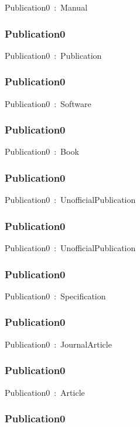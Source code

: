 \documentclass{article}
\begin{document}
Publication0~:~Manual

\subsubsection*{Publication0}

Publication0~:~Publication

\subsubsection*{Publication0}

Publication0~:~Software

\subsubsection*{Publication0}

Publication0~:~Book

\subsubsection*{Publication0}

Publication0~:~UnofficialPublication

\subsubsection*{Publication0}

Publication0~:~UnofficialPublication

\subsubsection*{Publication0}

Publication0~:~Specification

\subsubsection*{Publication0}

Publication0~:~JournalArticle

\subsubsection*{Publication0}

Publication0~:~Article

\subsubsection*{Publication0}
\end{document}
